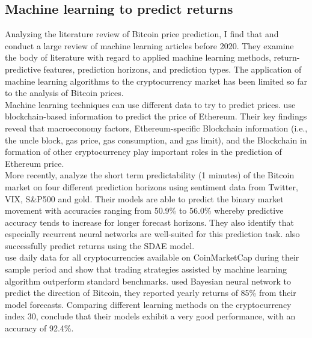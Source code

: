 \documentclass{article}
\begin{document}
	\subsection{Machine learning to predict returns}
	
	Analyzing the literature review of Bitcoin price prediction, I find that \cite{mlfbp} and \cite{caaic} conduct a large review of machine learning articles before 2020. They examine the body of literature with regard to applied machine learning methods, return-predictive features, prediction horizons, and prediction types. The application of machine learning algorithms to the cryptocurrency market has been limited so far to the analysis of Bitcoin prices.\\
	Machine learning techniques can use different data to try to predict prices. \cite{pepwm} use blockchain-based information to predict the price of Ethereum. Their key findings reveal that macroeconomy factors, Ethereum-specific Blockchain information (i.e., the uncle block, gas price, gas consumption, and gas limit), and the Blockchain in formation of other cryptocurrency play important roles in the prediction of Ethereum price.   \\
	
	More recently, \cite{stbmp} analyze the short term predictability (1 minutes) of the Bitcoin market on four different prediction horizons using sentiment data from Twitter, VIX, S&P500 and gold. Their models are able to predict the binary market movement with accuracies ranging from 50.9\% to 56.0\% whereby predictive accuracy tends to increase for longer forecast horizons. They also identify that especially recurrent neural networks are well-suited for this prediction task. \cite{ftpob} also successfully predict returns using the SDAE model. \\
	\cite{acpum} use daily data for all cryptocurrencies available on CoinMarketCap during their sample period and show that trading strategies assisted by machine learning algorithm outperform standard benchmarks.  \cite{brab} used Bayesian neural network to predict the direction of Bitcoin, they reported yearly returns of 85\% from their model forecasts. Comparing different learning methods on the cryptocurrency index 30, \cite{aatpa} conclude that their models exhibit a very good performance, with an accuracy of 92.4\%. \\
	
\end{document}
